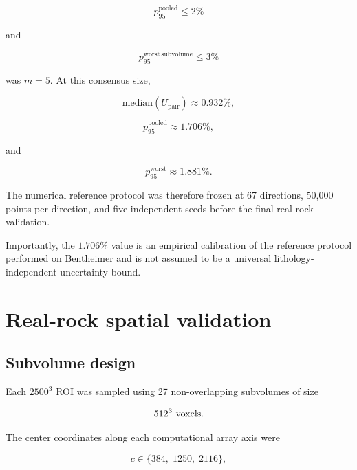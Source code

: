 \documentclass{article}
\begin{document}
\begin{equation}
    p_{95}^{\mathrm{pooled}}\leq2\%
\end{equation}

and

\begin{equation}
    p_{95}^{\mathrm{worst\ subvolume}}\leq3\%
\end{equation}

was $m=5$. At this consensus size,

\begin{equation}
    \mathrm{median}(U_{\mathrm{pair}})
    \approx0.932\%,
\end{equation}

\begin{equation}
    p_{95}^{\mathrm{pooled}}
    \approx1.706\%,
\end{equation}

and

\begin{equation}
    p_{95}^{\mathrm{worst}}
    \approx1.881\%.
\end{equation}

The numerical reference protocol was therefore frozen at
67 directions, 50,000 points per direction, and five independent seeds
before the final real-rock validation.

Importantly, the $1.706\%$ value is an empirical calibration of the
reference protocol performed on Bentheimer and is not assumed to be a
universal lithology-independent uncertainty bound.

\section{Real-rock spatial validation}
\label{sec:SI_real_validation}

\subsection{Subvolume design}
\label{sec:SI_subvolume}

Each $2500^3$ ROI was sampled using 27 non-overlapping subvolumes of
size

\begin{equation}
    512^3\ {\rm voxels}.
\end{equation}

The center coordinates along each computational array axis were

\begin{equation}
    c\in\{384,\;1250,\;2116\},
\end{equation}
\end{document}

